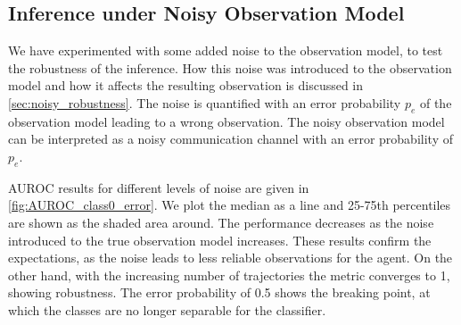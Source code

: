 \subsection{Inference under Noisy Observation Model}
We have experimented with some added noise to the observation model, to test the robustness of the inference. How this noise was introduced to the observation model and how it affects the resulting observation is discussed in \cref{sec:noisy_robustness}. The noise is quantified with an error probability $ p_e $ of the observation model leading to a wrong observation. The noisy observation model can be interpreted as a noisy communication channel with an error probability of $ p_e $. \par
AUROC results for different levels of noise are given in \autoref{fig:AUROC_class0_error}. We plot the median as a line and 25-75th percentiles are shown as the shaded area around. The performance decreases as the noise introduced to the true observation model increases. These results confirm the expectations, as the noise leads to less reliable observations for the agent. On the other hand, with the increasing number of trajectories the metric converges to 1, showing robustness. The error probability of 0.5 shows the breaking point, at which the classes are no longer separable for the classifier. 
\pagebreak

